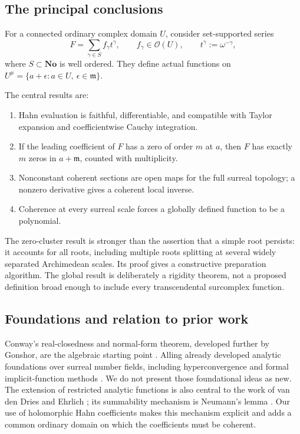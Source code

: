 \documentclass[11pt,oneside]{article}
\numberwithin{equation}{section}
\theoremstyle{definition}
\theoremstyle{remark}\newtheorem{remark}[theorem]{Remark}
\newcommand{\No}{\mathbf{No}}
\newcommand{\OO}{\mathcal O}
\newcommand{\m}{\mathfrak m}
\begin{document}
\subsection{The principal conclusions}
\begin{keybox}
For a connected ordinary complex domain $U$, consider set-supported series
\[
 F=\sum_{\gamma\in S} f_\gamma t^\gamma,
 \qquad f_\gamma\in\OO(U),\qquad t^\gamma:=\omega^{-\gamma},
\]
where $S\subset\No$ is well ordered. They define actual functions on
$U^\mu=\{a+\epsilon:a\in U,\ \epsilon\in\m\}$.

The central results are:
\begin{enumerate}[leftmargin=*,itemsep=2pt]
\item Hahn evaluation is faithful, differentiable, and compatible with
Taylor expansion and coefficientwise Cauchy integration.
\item If the leading coefficient of $F$ has a zero of order $m$ at $a$,
then $F$ has exactly $m$ zeros in $a+\m$, counted with multiplicity.
\item Nonconstant coherent sections are open maps for the full surreal
topology; a nonzero derivative gives a coherent local inverse.
\item Coherence at every surreal scale forces a globally defined function
to be a polynomial.
\end{enumerate}
\end{keybox}
The zero-cluster result is stronger than the assertion that a simple root
persists: it accounts for all roots, including multiple roots splitting at
several widely separated Archimedean scales. Its proof gives a constructive
preparation algorithm. The global result is deliberately a rigidity theorem,
not a proposed definition broad enough to include every transcendental
surcomplex function.

\subsection{Foundations and relation to prior work}
Conway's real-closedness and normal-form theorem, developed further by
Gonshor, are the algebraic starting point \cite{Conway,Gonshor}.
Alling already developed analytic foundations over surreal number fields,
including hyperconvergence and formal implicit-function methods
\cite{Alling,AllingShort}. We do not present those foundational ideas as new.
The extension of restricted analytic functions is also central to the work
of van den Dries and Ehrlich \cite{vdDE}; its summability mechanism is
Neumann's lemma \cite{Neumann}. Our use of holomorphic Hahn coefficients
makes this mechanism explicit and adds a common ordinary domain on which
the coefficients must be coherent.
\end{document}
